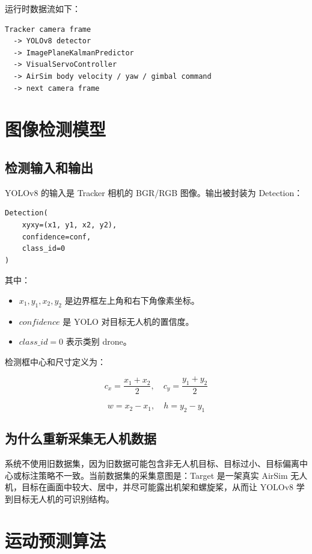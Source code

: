 \documentclass[UTF8,a4paper,11pt]{ctexart}
\begin{document}
运行时数据流如下：

\begin{lstlisting}
Tracker camera frame
  -> YOLOv8 detector
  -> ImagePlaneKalmanPredictor
  -> VisualServoController
  -> AirSim body velocity / yaw / gimbal command
  -> next camera frame
\end{lstlisting}

\section{图像检测模型}

\subsection{检测输入和输出}

YOLOv8 的输入是 Tracker 相机的 BGR/RGB 图像。输出被封装为 Detection：

\begin{lstlisting}
Detection(
    xyxy=(x1, y1, x2, y2),
    confidence=conf,
    class_id=0
)
\end{lstlisting}

其中：

\begin{itemize}
  \item $x_1,y_1,x_2,y_2$ 是边界框左上角和右下角像素坐标。
  \item $confidence$ 是 YOLO 对目标无人机的置信度。
  \item $class\_id=0$ 表示类别 drone。
\end{itemize}

检测框中心和尺寸定义为：

\[
c_x=\frac{x_1+x_2}{2}, \quad
c_y=\frac{y_1+y_2}{2}
\]

\[
w=x_2-x_1, \quad h=y_2-y_1
\]

\subsection{为什么重新采集无人机数据}

系统不使用旧数据集，因为旧数据可能包含非无人机目标、目标过小、目标偏离中心或标注策略不一致。当前数据集的采集意图是：Target 是一架真实 AirSim 无人机，目标在画面中较大、居中，并尽可能露出机架和螺旋桨，从而让 YOLOv8 学到目标无人机的可识别结构。

\section{运动预测算法}
\end{document}
